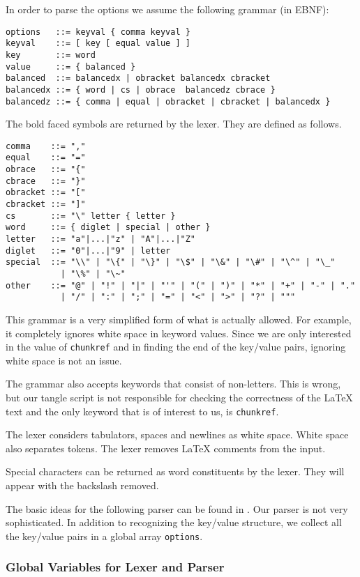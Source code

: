 \documentclass[a4paper]{article} %
\begin{document}
In order to parse the options we assume the following grammar (in
EBNF):
\begin{lstlisting}[keywords={comma, equal, word, cs, obrace, cbrace,
    obracket, cbracket}, label=grammar]
options   ::= keyval { comma keyval }
keyval    ::= [ key [ equal value ] ]
key       ::= word
value     ::= { balanced }
balanced  ::= balancedx | obracket balancedx cbracket
balancedx ::= { word | cs | obrace  balancedz cbrace }
balancedz ::= { comma | equal | obracket | cbracket | balancedx }
\end{lstlisting}
The bold faced symbols are returned by the lexer. They are defined as
follows.
\begin{lstlisting}[string={[d]"},stringstyle=\ttfamily]
comma    ::= ","
equal    ::= "="
obrace   ::= "{"
cbrace   ::= "}"
obracket ::= "["
cbracket ::= "]"
cs       ::= "\" letter { letter }
word     ::= { diglet | special | other }
letter   ::= "a"|...|"z" | "A"|...|"Z"
diglet   ::= "0"|...|"9" | letter
special  ::= "\\" | "\{" | "\}" | "\$" | "\&" | "\#" | "\^" | "\_"
           | "\%" | "\~"
other    ::= "@" | "!" | "|" | "'" | "(" | ")" | "*" | "+" | "-" | "."
           | "/" | ":" | ";" | "=" | "<" | ">" | "?" | """
\end{lstlisting}
This grammar is a very simplified form of what is actually allowed.
For example, it completely ignores white space in keyword values.
Since we are only interested in the value of \texttt{chunkref} and in
finding the end of the key/value pairs, ignoring white space is not an
issue.

The grammar also accepts keywords that consist of non-letters. This is
wrong, but our tangle script is not responsible for checking the
correctness of the \LaTeX{} text and the only keyword that is of
interest to us, is \texttt{chunkref}.

The lexer considers tabulators, spaces and newlines as white space.
White space also separates tokens. The lexer removes \LaTeX{} comments
from the input.

Special characters can be returned as word constituents by the lexer.
They will appear with the backslash removed.

The basic ideas for the following parser can be found in
\cite[pp.~9--20]{Wirth:2005}. Our parser is not very sophisticated. In
addition to recognizing the key/value structure, we collect all the
key/value pairs in a global array \texttt{options}.

\subsubsection{Global Variables for Lexer and Parser}
\end{document}
